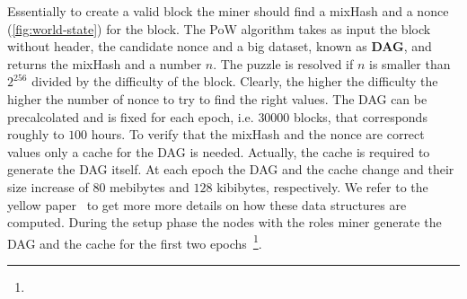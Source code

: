 Essentially to create a valid block the miner should find a mixHash and
a nonce (\autoref{fig:world-state}) for the block.
The PoW algorithm takes as input the block without header, the candidate
nonce and a big dataset, known as \textbf{DAG}, and
returns the mixHash and a number $n$. The puzzle is resolved if
$n$ is smaller than $2^{256}$ divided by the difficulty of the block. Clearly,
the higher the difficulty the higher the number of nonce to try to find the
right values. The DAG can be precalcolated and is fixed for each epoch, i.e.
$30000$ blocks, that corresponds roughly to $100$ hours. To verify
that the mixHash and the nonce are correct values only a cache for the
DAG is needed. Actually, the cache is required to generate the DAG itself.
At each epoch the DAG and the cache change and their size increase of
$80$ mebibytes and $128$ kibibytes, respectively.
We refer to the yellow paper~\cite[Appendix J]{wood2018ethereum} to get more
more details on how these data structures are computed.
During the setup phase the nodes with the roles miner generate the
DAG and the cache for the first two epochs~\footnote{}.





